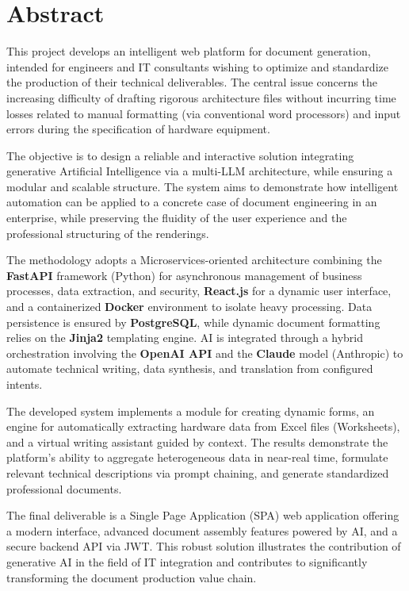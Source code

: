 \documentclass[12pt, a4paper]{report}
\begin{document}
\chapter*{Abstract}
This project develops an intelligent web platform for document generation, intended for engineers and IT consultants wishing to optimize and standardize the production of their technical deliverables. The central issue concerns the increasing difficulty of drafting rigorous architecture files without incurring time losses related to manual formatting (via conventional word processors) and input errors during the specification of hardware equipment.

The objective is to design a reliable and interactive solution integrating generative Artificial Intelligence via a multi-LLM architecture, while ensuring a modular and scalable structure. The system aims to demonstrate how intelligent automation can be applied to a concrete case of document engineering in an enterprise, while preserving the fluidity of the user experience and the professional structuring of the renderings.

The methodology adopts a Microservices-oriented architecture combining the \textbf{FastAPI} framework (Python) for asynchronous management of business processes, data extraction, and security, \textbf{React.js} for a dynamic user interface, and a containerized \textbf{Docker} environment to isolate heavy processing. Data persistence is ensured by \textbf{PostgreSQL}, while dynamic document formatting relies on the \textbf{Jinja2} templating engine. AI is integrated through a hybrid orchestration involving the \textbf{OpenAI API} and the \textbf{Claude} model (Anthropic) to automate technical writing, data synthesis, and translation from configured intents.

The developed system implements a module for creating dynamic forms, an engine for automatically extracting hardware data from Excel files (Worksheets), and a virtual writing assistant guided by context. The results demonstrate the platform’s ability to aggregate heterogeneous data in near-real time, formulate relevant technical descriptions via prompt chaining, and generate standardized professional documents.

The final deliverable is a Single Page Application (SPA) web application offering a modern interface, advanced document assembly features powered by AI, and a secure backend API via JWT. This robust solution illustrates the contribution of generative AI in the field of IT integration and contributes to significantly transforming the document production value chain.
\end{document}
